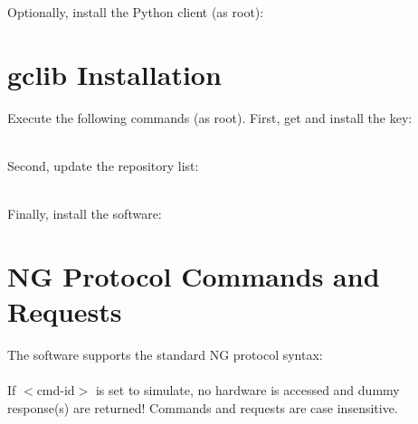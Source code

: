 \documentclass[12pt,twoside]{article}
\begin{document}
\noindent Optionally, install the Python client (as root): \\




\section{gclib Installation}
\label{AppendixB}

Execute the following commands (as root). First, get and install the key: \\


 \\

\noindent Second, update the repository list: \\


 \\

\noindent Finally, install the software: \\




\newpage
\section{NG Protocol Commands and Requests}
\label{AppendixC}

The software supports the standard NG protocol syntax: \\

 \\

\noindent If $<$cmd-id$>$ is set to {\sc simulate}, no hardware is accessed and dummy response(s) are returned!
Commands and requests are case insensitive. \\
\end{document}
